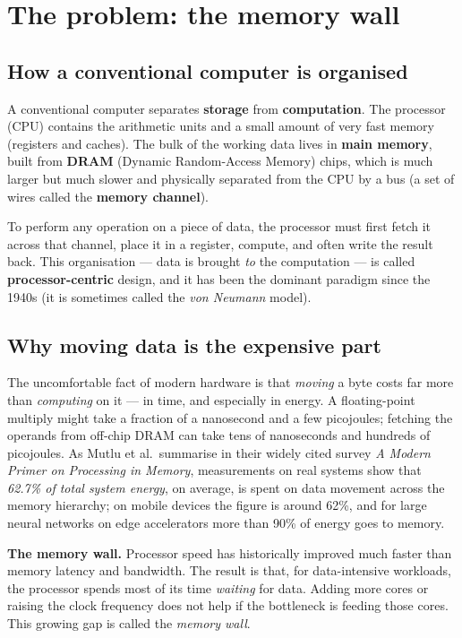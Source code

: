 \documentclass[11pt,a4paper]{article}
\newcommand{\term}[1]{\textbf{\color{slate}#1}}
\begin{document}
\section{The problem: the memory wall}

\subsection{How a conventional computer is organised}

A conventional computer separates \term{storage} from \term{computation}. The processor (CPU)
contains the arithmetic units and a small amount of very fast memory (registers and caches). The
bulk of the working data lives in \term{main memory}, built from \term{DRAM} (Dynamic Random-Access
Memory) chips, which is much larger but much slower and physically separated from the CPU by a bus
(a set of wires called the \term{memory channel}).

To perform any operation on a piece of data, the processor must first fetch it across that channel,
place it in a register, compute, and often write the result back. This organisation --- data is
brought \emph{to} the computation --- is called \term{processor-centric} design, and it has been the
dominant paradigm since the 1940s (it is sometimes called the \emph{von Neumann} model).

\subsection{Why moving data is the expensive part}

The uncomfortable fact of modern hardware is that \emph{moving} a byte costs far more than
\emph{computing} on it --- in time, and especially in energy. A floating-point multiply might take a
fraction of a nanosecond and a few picojoules; fetching the operands from off-chip DRAM can take
tens of nanoseconds and hundreds of picojoules. As Mutlu et al.\ summarise in their widely cited
survey \emph{A Modern Primer on Processing in Memory}, measurements on real systems show that
\emph{62.7\% of total system energy}, on average, is spent on data movement across the memory
hierarchy; on mobile devices the figure is around 62\%, and for large neural networks on edge
accelerators more than 90\% of energy goes to memory.

\begin{keybox}
\term{The memory wall.} Processor speed has historically improved much faster than memory
latency and bandwidth. The result is that, for data-intensive workloads, the processor spends most
of its time \emph{waiting} for data. Adding more cores or raising the clock frequency does not help
if the bottleneck is feeding those cores. This growing gap is called the \emph{memory wall}.
\end{keybox}
\end{document}
